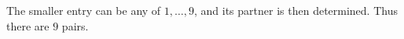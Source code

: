 The smaller entry can be any of $1,\ldots,9$, and its partner is then determined. Thus there are $\boxed9$ pairs.

